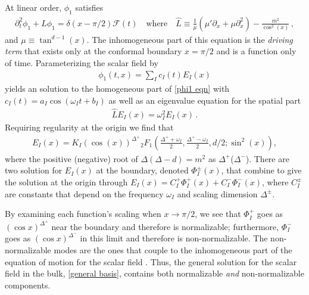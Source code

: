 \documentclass[letterpaper,11pt]{article}
\newcommand{\p}{\partial}
\newcommand{\mc}{\mathcal}
\begin{document}
At linear order, $\phi_1$ satisfies
\begin{align}
\label{phi1 eqn}
\p^2_t \phi_1 + \hat L \phi_1 = \delta(x - \pi/2) \mc F(t) \quad \text{where} \quad \hat{L} \equiv \frac{1}{\mu} (\mu' \p_x + \mu \p^2_x)  - \frac{m^2}{\cos^2(x)} \, ,
\end{align}
and $\mu \equiv \tan^{d-1}(x)$. The inhomogeneous part of this equation is the \emph{driving term} that exists
only at the conformal boundary $x = \pi/2$ and is a function only of time. Parameterizing the scalar field by
\begin{align}
	\phi_1 (t, x) = \sum_I c_I (t) E_I (x)
\end{align}
yields an solution to the homogeneous part of \eqref{phi1 eqn} with $c_I(t) = a_I \cos \left( \omega_I t + b_I \right)$ as well as an
eigenvalue equation for the spatial part
\begin{align}
	\label{eigen eqn}
\hat L E_I (x) = \omega_I^2 E_I (x) \, .
\end{align}
Requiring regularity at the origin we find that \cite{Nastase}
\begin{align}
	\label{general basis}
	E_I (x) =  K_I \left( \cos(x) \right)^{\Delta^+} {_2F_1} \left(\frac{\Delta^+ + \omega_I}{2}, \frac{\Delta^+ - \omega_I}{2}, d/2 ; \sin^2 (x) \right) ,
\end{align}
where the positive (negative) root of $\Delta (\Delta - d) = m^2$ as $\Delta^+$($\Delta^-$). There are two solution for $E_I(x)$ at 
the boundary, denoted $\Phi^\pm_I (x)$, that combine to give the solution at the origin through $E_I (x) = C_I^+ \Phi^+_I(x) + C^{-}_I \Phi^{-}_I (x)$, where
$C^{\pm}_I$ are constants that depend on the frequency $\omega_I$ and scaling dimension $\Delta^{\pm}$.

By examining each function's scaling when $x \to \pi/2$,  we see that $\Phi_I^+$ goes as $(\cos x )^{\Delta^+}$\!\! near the boundary and therefore is normalizable; 
furthermore, $\Phi_I^-$ goes as $( \cos x )^{\Delta^-}$ in this limit and therefore is non-normalizable. 
The non-normalizable modes are the ones that couple to the inhomogeneous part of the equation of motion for the scalar field \cite{hep-th/9805171}. 
Thus, the general solution for the scalar field in the bulk, \eqref{general basis}, contains both 
normalizable \emph{and} non-normalizable components.
\end{document}
